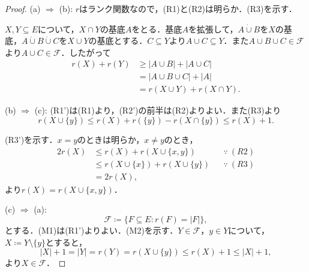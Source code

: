 \documentclass[xelatex,ja=standard,a4paper,14pt,everyparhook=compat]{bxjsarticle}
\newcommand{\dotcup}{\mathbin{\dot\cup}}
\theoremstyle{definition}
\begin{document}
\begin{proof}
    (a) $\Longrightarrow$ (b): $r$はランク関数なので，(R1)と(R2)は明らか．(R3)を示す．

    $X, Y \subseteq E$について，$X \cap Y$の基底$A$をとる．基底$A$を拡張して，$A \dotcup B$を$X$の基底，$A \dotcup B \dotcup C$を$X \cup Y$の基底とする．$C \subseteq Y$より$A \cup C \subseteq Y$．また$A \cup B \cup C \in \mathcal{F}$より$A \cup C \in \mathcal{F}$．したがって \begin{align*}
        r(X) + r(Y)
         & \geq |A \cup B| + |A \cup C| \\
         & = |A \cup B \cup C| + |A|    \\
         & = r(X \cup Y) + r(X \cap Y).
    \end{align*}

    (b) $\Longrightarrow$ (c): (R1')は(R1)より，(R2')の前半は(R2)よりよい．また(R3)より \begin{equation*}
        r(X \cup \{y\}) \leq r(X) + r(\{y\}) - r(X \cap \{y\}) \leq r(X) + 1.
    \end{equation*}

    \newpage

    (R3')を示す．$x = y$のときは明らか，$x \neq y$のとき， \begin{align*}
        2r(X) & \leq r(X) + r(X \cup \{x, y\})         &  & \because \ (R2) \\
              & \leq r(X \cup \{x\}) + r(X \cup \{y\}) &  & \because \ (R3) \\
              & = 2r(X),
    \end{align*}
    より$r(X) = r(X \cup \{x,y\})$．

    (c) $\Longrightarrow$ (a): \begin{equation*}
        \mathcal{F} \coloneqq \{F \subseteq E : r(F) = |F|\},
    \end{equation*}
    とする．(M1)は(R1')よりよい．(M2)を示す．$Y \in \mathcal{F}$，$y \in Y$について，$X \coloneqq Y \setminus \{y\}$とすると， \begin{equation*}
        |X| + 1 = |Y| = r(Y) = r(X \cup \{y\}) \leq r(X) + 1 \leq |X| + 1,
    \end{equation*}
    より$X \in \mathcal{F}$．


\end{proof}
\end{document}
